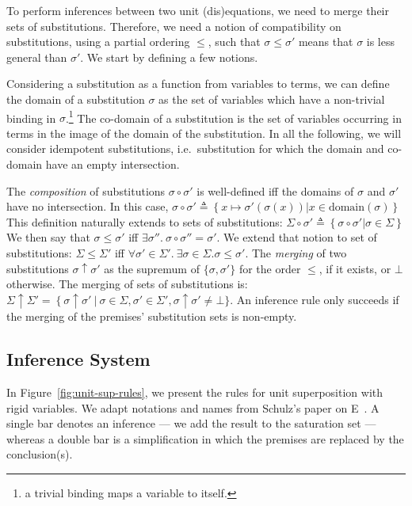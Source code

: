 To perform inferences between two unit (dis)equations, we need to
merge their sets of substitutions.
Therefore, we need a notion of compatibility on substitutions, using a
partial ordering $\leq$, such that $\sigma \leq \sigma'$ means that $\sigma$ is
less general than $\sigma'$.
We start by defining a few notions.

Considering a substitution as a function from variables to terms, we can define
the domain of a substitution $\sigma$ as the set of variables which have a non-trivial
binding in $\sigma$.\footnote{a trivial binding maps a variable to itself.}
The co-domain of a substitution is the set of variables occurring in terms in the image of
the domain of the substitution.
In all the following, we will consider idempotent substitutions, i.e.~substitution for which
the domain and co-domain have an empty intersection.


The {\em composition} of substitutions $\sigma \circ \sigma'$
is well-defined iff the domains of $\sigma$ and $\sigma'$ have no
intersection.
In this case,
$\sigma \circ \sigma' \triangleq \left\{ x \mapsto \sigma'(\sigma(x)) | x \in \text{domain}(\sigma) \right\}$
This definition naturally extends to sets of substitutions:
$\Sigma \circ \sigma' \triangleq \left\{ \sigma \circ \sigma' | \sigma \in \Sigma \right\}$
We then say that $\sigma \leq \sigma'$ iff $\exists \sigma''.~ \sigma \circ \sigma'' = \sigma'$.
We extend that notion to set of substitutions:
$\Sigma \leq \Sigma'$ iff $\forall \sigma' \in \Sigma'.~ \exists \sigma \in \Sigma. \sigma \leq \sigma'$.
The {\em merging} of two substitutions $\sigma \uparrow \sigma'$ as the supremum of $\{\sigma,\sigma'\}$
for the order $\leq$, if it exists, or $\bot$ otherwise.
The merging of sets of substitutions is:
$\Sigma \uparrow \Sigma' =
  \left\{ \sigma \uparrow \sigma' ~|~
    \sigma \in \Sigma, \sigma' \in \Sigma' \right.,
  \sigma \uparrow \sigma' \not= \bot
  \}$.
An inference rule only succeeds if the merging of the premises' substitution
sets is non-empty.


\subsection{Inference System}

In Figure~\ref{fig:unit-sup-rules}, we present the  rules for unit superposition
with rigid variables.
We adapt notations and names from Schulz's paper on E~\cite{e_brainiac_prover}.
A single bar denotes an inference --- we add the result to the saturation set ---
whereas a double bar is a simplification in which the premises are
replaced by the conclusion(s).

